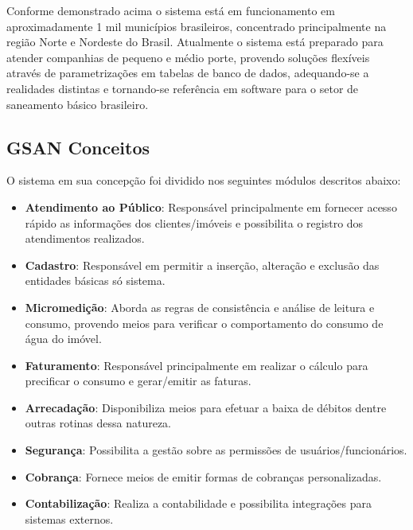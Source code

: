 Conforme demonstrado acima o sistema está em funcionamento em aproximadamente 1 mil municípios brasileiros, concentrado principalmente na região Norte e Nordeste do Brasil. Atualmente o sistema está preparado para atender companhias de pequeno e médio porte, provendo soluções flexíveis através de parametrizações em tabelas de banco de dados, adequando-se a realidades distintas e tornando-se referência em software para o setor de saneamento básico brasileiro. 

\subsection{GSAN Conceitos}

O sistema em sua concepção foi dividido nos seguintes módulos descritos abaixo:

\begin{itemize}
\item \textbf{Atendimento ao Público}: Responsável principalmente em fornecer acesso rápido as informações dos clientes/imóveis e possibilita o registro dos atendimentos realizados. \\
\item \textbf{Cadastro}: Responsável em permitir a inserção, alteração e exclusão das entidades básicas só sistema. \\
\item \textbf{Micromedição}: Aborda as regras de consistência e análise de leitura e consumo, provendo meios para verificar o comportamento do consumo de água do imóvel. \\
\item \textbf{Faturamento}: Responsável principalmente em realizar o cálculo para precificar o consumo e gerar/emitir as faturas. \\
\item \textbf{Arrecadação}: Disponibiliza meios para efetuar a baixa de débitos dentre outras rotinas dessa natureza. \\
\item \textbf{Segurança}: Possibilita a gestão sobre as permissões de usuários/funcionários. \\
\item \textbf{Cobrança}: Fornece meios de emitir formas de cobranças personalizadas. \\
\item \textbf{Contabilização}: Realiza a contabilidade e possibilita integrações para sistemas externos. \\
\end{itemize}

